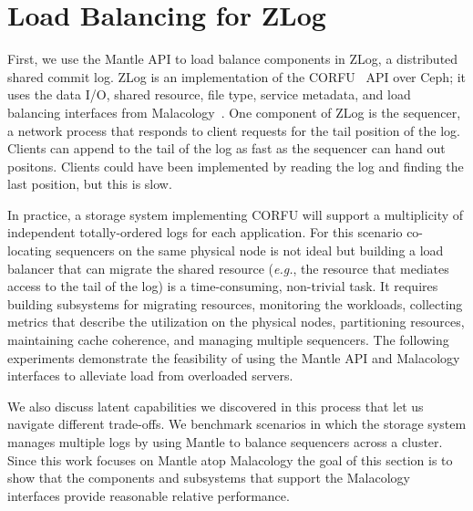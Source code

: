 \section{Load Balancing for ZLog}
\label{sec:zlog}

First, we use the Mantle API to load balance components in ZLog, a distributed
shared commit log.  ZLog is an implementation of the
CORFU~\cite{balakrishnan_corfu_2012} API over Ceph; it uses the data I/O,
shared resource, file type, service metadata, and load balancing interfaces
from Malacology~\cite{sevilla:eurosys17-malacology}. One component of ZLog is
the sequencer, a network process that responds to client requests for the tail
position of the log.  Clients can append to the tail of the log as fast as the
sequencer can hand out positons. Clients could have been implemented by reading
the log and finding the last position, but this is slow. 

In practice, a storage system implementing CORFU will support a multiplicity of
independent totally-ordered logs for each application.  For this scenario
co-locating sequencers on the same physical node is not ideal but building a
load balancer that can migrate the shared resource ({\it e.g.}, the resource
that mediates access to the tail of the log) is a time-consuming, non-trivial
task.  It requires building subsystems for migrating resources, monitoring the
workloads, collecting metrics that describe the utilization on the physical
nodes, partitioning resources, maintaining cache coherence, and managing
multiple sequencers. The following experiments demonstrate the feasibility of
using the Mantle API and Malacology interfaces to alleviate load from
overloaded servers.

We also discuss latent capabilities we discovered in this process that let us
navigate different trade-offs.  We benchmark scenarios in which the storage
system manages multiple logs by using Mantle to balance sequencers across a
cluster.  Since this work focuses on Mantle atop Malacology the goal of this
section is to show that the components and subsystems that support the
Malacology interfaces provide reasonable relative performance.


